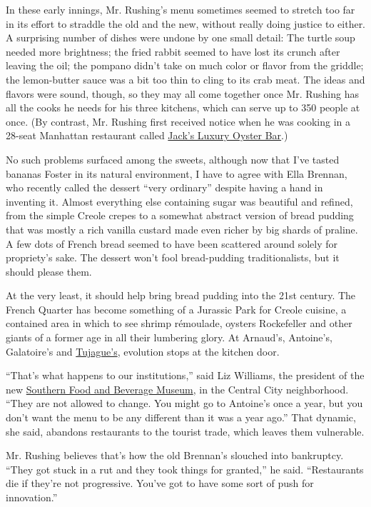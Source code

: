 In these early innings, Mr. Rushing's menu sometimes seemed to stretch
too far in its effort to straddle the old and the new, without really
doing justice to either. A surprising number of dishes were undone by
one small detail: The turtle soup needed more brightness; the fried
rabbit seemed to have lost its crunch after leaving the oil; the pompano
didn't take on much color or flavor from the griddle; the lemon-butter
sauce was a bit too thin to cling to its crab meat. The ideas and
flavors were sound, though, so they may all come together once Mr.
Rushing has all the cooks he needs for his three kitchens, which can
serve up to 350 people at once. (By contrast, Mr. Rushing first received
notice when he was cooking in a 28-seat Manhattan restaurant called
\href{http://www.nytimes3xbfgragh.onion/restaurants/1065698268587/jacks-luxury-oyster-bar/details.html}{Jack's
Luxury Oyster Bar}.)

No such problems surfaced among the sweets, although now that I've
tasted bananas Foster in its natural environment, I have to agree with
Ella Brennan, who recently called the dessert ``very ordinary'' despite
having a hand in inventing it. Almost everything else containing sugar
was beautiful and refined, from the simple Creole crepes to a somewhat
abstract version of bread pudding that was mostly a rich vanilla custard
made even richer by big shards of praline. A few dots of French bread
seemed to have been scattered around solely for propriety's sake. The
dessert won't fool bread-pudding traditionalists, but it should please
them.

At the very least, it should help bring bread pudding into the 21st
century. The French Quarter has become something of a Jurassic Park for
Creole cuisine, a contained area in which to see shrimp rémoulade,
oysters Rockefeller and other giants of a former age in all their
lumbering glory. At Arnaud's, Antoine's, Galatoire's and
\href{http://www.tujaguesrestaurant.com/}{Tujague's}, evolution stops at
the kitchen door.

``That's what happens to our institutions,'' said Liz Williams, the
president of the new \href{http://southernfood.org/}{Southern Food and
Beverage Museum}, in the Central City neighborhood. ``They are not
allowed to change. You might go to Antoine's once a year, but you don't
want the menu to be any different than it was a year ago.'' That
dynamic, she said, abandons restaurants to the tourist trade, which
leaves them vulnerable.

Mr. Rushing believes that's how the old Brennan's slouched into
bankruptcy. ``They got stuck in a rut and they took things for
granted,'' he said. ``Restaurants die if they're not progressive. You've
got to have some sort of push for innovation.''

